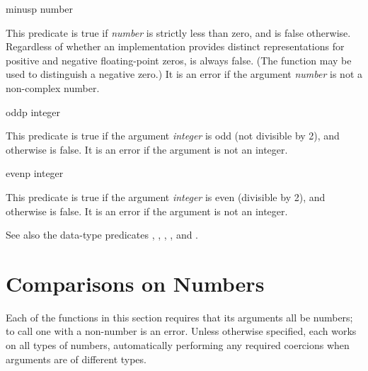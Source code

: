 \begin{defun}[Function]
minusp number

This predicate is true if {\it number} is strictly less than zero,
and is false otherwise.
Regardless of whether an implementation provides distinct representations
for positive and negative floating-point zeros,
 is always false.
(The function  may be used to distinguish a negative zero.)
It is an error if the argument {\it number} is not a non-complex number.
\end{defun}

\begin{defun}[Function]
oddp integer

This predicate is true if the argument {\it integer} is odd (not divisible
by 2), and otherwise is false.  It is an error if the argument is not
an integer.
\end{defun}

\begin{defun}[Function]
evenp integer

This predicate is true if the argument {\it integer} is even (divisible
by 2), and otherwise is false.  It is an error if the argument is not
an integer.
\end{defun}

See also the data-type predicates ,
, , , and .

\section{Comparisons on Numbers}

Each of the functions in this section requires that its arguments all be
numbers; to call one with a non-number is an error.  Unless otherwise
specified, each works on all types of numbers, automatically performing
any required coercions when arguments are of different types.

